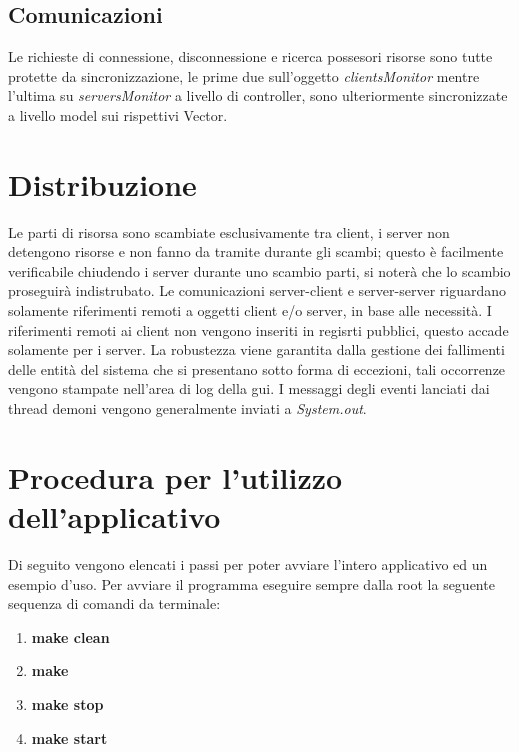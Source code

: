 \documentclass[
10pt, %
a4paper, %
oneside, %
BCOR5mm, %
]{scrartcl}
\begin{document}
	\subsection{Comunicazioni}
	Le richieste di connessione, disconnessione e ricerca possesori risorse sono tutte protette da sincronizzazione, le prime due sull'oggetto \textit{clientsMonitor} mentre l'ultima su \textit{serversMonitor} a livello di controller, sono ulteriormente sincronizzate a livello model sui rispettivi Vector.


\section{Distribuzione}

	Le parti di risorsa sono scambiate esclusivamente tra client, i server non detengono risorse e non fanno da tramite durante gli scambi; questo è facilmente verificabile chiudendo i server durante uno scambio parti, si noterà che lo scambio proseguirà indistrubato. Le comunicazioni server-client e server-server riguardano solamente riferimenti remoti a oggetti client e/o server, in base alle necessità.
	I riferimenti remoti ai client non vengono inseriti in regisrti pubblici, questo accade solamente per i server.
	La robustezza viene garantita dalla gestione dei fallimenti delle entità del sistema che si presentano sotto forma di eccezioni, tali occorrenze vengono stampate nell'area di log della gui. I messaggi degli eventi lanciati dai thread demoni vengono generalmente inviati a \emph{System.out}.


\section{Procedura per l'utilizzo dell'applicativo}
	
	Di seguito vengono elencati i passi per poter avviare l'intero applicativo ed un esempio d'uso. 
	Per avviare il programma eseguire sempre dalla root la seguente sequenza di comandi da terminale:

		\begin{enumerate}
			\item  \textbf{make clean}
			\item  \textbf{make}
			\item  \textbf{make stop}
			\item  \textbf{make start}
		\end{enumerate}
\end{document}
